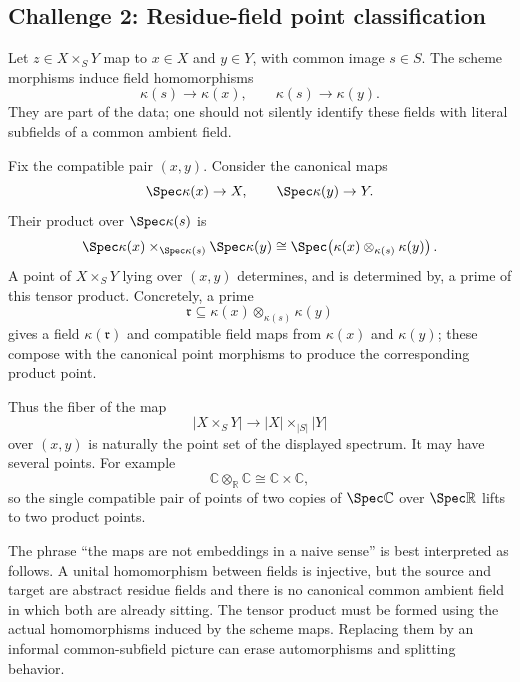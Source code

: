 \subsection*{Challenge 2: Residue-field point classification}
\begin{solution}
Let $z\in X\times_SY$ map to $x\in X$ and $y\in Y$, with common image $s\in S$.  The scheme
morphisms induce field homomorphisms
\[
\kappa(s)\longrightarrow\kappa(x),
\qquad
\kappa(s)\longrightarrow\kappa(y).
\]
They are part of the data; one should not silently identify these fields with literal subfields of
a common ambient field.

Fix the compatible pair $(x,y)$.  Consider the canonical maps
\[
\Spec\kappa(x)\to X,\qquad \Spec\kappa(y)\to Y.
\]
Their product over $\Spec\kappa(s)$ is
\[
\Spec\kappa(x)\times_{\Spec\kappa(s)}\Spec\kappa(y)
\cong
\Spec\!\left(\kappa(x)\otimes_{\kappa(s)}\kappa(y)\right).
\]
A point of $X\times_SY$ lying over $(x,y)$ determines, and is determined by, a prime of this
tensor product.  Concretely, a prime
\[
\mathfrak r\subseteq\kappa(x)\otimes_{\kappa(s)}\kappa(y)
\]
gives a field $\kappa(\mathfrak r)$ and compatible field maps from $\kappa(x)$ and $\kappa(y)$;
these compose with the canonical point morphisms to produce the corresponding product point.

Thus the fiber of the map
\[
|X\times_SY|\to |X|\times_{|S|}|Y|
\]
over $(x,y)$ is naturally the point set of the displayed spectrum.  It may have several points.
For example
\[
\mathbb C\otimes_{\mathbb R}\mathbb C\cong\mathbb C\times\mathbb C,
\]
so the single compatible pair of points of two copies of $\Spec\mathbb C$ over
$\Spec\mathbb R$ lifts to two product points.

The phrase ``the maps are not embeddings in a naive sense'' is best interpreted as follows.
A unital homomorphism between fields is injective, but the source and target are abstract residue
fields and there is no canonical common ambient field in which both are already sitting.  The
tensor product must be formed using the actual homomorphisms induced by the scheme maps.  Replacing
them by an informal common-subfield picture can erase automorphisms and splitting behavior.
\end{solution}

